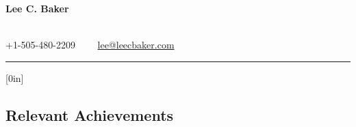 \documentclass[10pt,margin=1in]{article}
\newcommand{\resheading}[1]{{\large \colorbox{mygrey}{\begin{minipage}{\textwidth}{\textbf{#1 \vphantom{p\^{E}}}}\end{minipage}}}}
\begin{document}
\begin{center}
{\LARGE \textbf{Lee C. Baker}}
\begin{comment}
2775 N. Roadrunner Parkway \#302\ \ \textbullet
\ \ Christchurch, New Zealand
\end{comment}
\\
+1-505-480-2209\ \ \textbullet
\ \ \href{mailto:lee@leecbaker.com}{lee@leecbaker.com}
\end{center}

\hrule
\vspace{-0.4em}

\titlespacing {\section}{0in}{1.2em}{0in}[0in]

\begin{comment}
\resheading{Objective}
\label{obj}
A productive career at a competitive company where talented people work with cutting-edge technology to deliver useful products and innovative solutions.
\end{comment}
 
\subsection{Relevant Achievements}
\label{exp}
\end{document}
